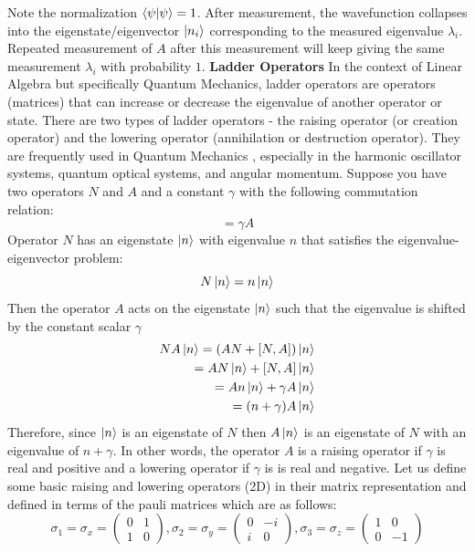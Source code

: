 Note the normalization $\braket{\psi|\psi} = 1$. \newline
After measurement, the wavefunction collapses into the eigenstate/eigenvector $\ket{n_{i}}$ corresponding to the measured eigenvalue $\lambda_{i}$.
Repeated measurement of $A$ after this measurement will keep giving the same measurement $\lambda_{i}$ with probability $1$. \newline
\textbf{Ladder Operators} \newline
In the context of Linear Algebra but specifically Quantum Mechanics, ladder operators are operators (matrices) that can increase or decrease the eigenvalue of another operator or state. There are two types of ladder operators - the raising operator (or creation operator) and the lowering operator (annihilation or destruction operator). They are frequently used in Quantum Mechanics , especially in the harmonic oscillator systems, quantum optical systems, and angular momentum. \newline
Suppose you have two operators $N$ and $A$ and a constant $\gamma$ with the following commutation relation:
\begin{equation}
    [N, A] = \gamma A
\end{equation}
Operator $N$ has an eigenstate $\ket{n}$ with eigenvalue $n$ that satisfies the eigenvalue-eigenvector problem:
\begin{equation}
    N\ket{n} = n \ket{n}
\end{equation}
Then the operator $A$ acts on the eigenstate $\ket{n}$ such that the eigenvalue is shifted by the constant scalar $\gamma$ 
\begin{eqnarray}
NA\ket{n} = (AN + [N,A])\ket{n} \\
= AN\ket{n} + [N,A]\ket{n} \\
= An\ket{n} + \gamma A\ket{n} \\
 = (n + \gamma) A \ket{n} 
\end{eqnarray}
Therefore, since $\ket{n}$ is an eigenstate of $N$ then $A\ket{n}$ is an eigenstate of $N$ with an eigenvalue of $n + \gamma$. In other words, the operator $A$ is a raising operator if $\gamma$ is real and positive and a lowering operator if $\gamma$ is is real and negative. \newline
Let us define some basic raising and lowering operators (2D) in their matrix representation and defined in terms of the pauli matrices which are as follows: 
\begin{equation}
    \sigma_{1} = \sigma_{x} =  \begin{pmatrix} 0 & 1 \\ 1 & 0 \end{pmatrix} ,
    \sigma_{2} = \sigma_{y} = \begin{pmatrix} 0 & -i \\ i & 0 \end{pmatrix} ,
    \sigma_{3} = \sigma_{z} = \begin{pmatrix} 1 & 0 \\ 0 & -1 \end{pmatrix} 
\end{equation}

